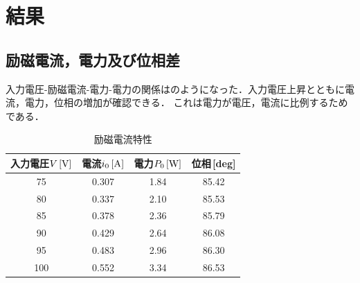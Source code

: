 \clearpage

\section{結果}
\subsection{励磁電流，電力及び位相差}
入力電圧-励磁電流-電力-電力の関係はのようになった．入力電圧上昇とともに電流，電力，位相の増加が確認できる．
	これは電力が電圧，電流に比例するためである．
	\begin{table}[h]
	\centering
	\caption{励磁電流特性}
	\label{tab:re1}
	\begin{tabular}{cccc}
	\hline
	入力電圧$V\,[\rm{V}]$& 電流$i_{0}\,[\rm{A}]$& 電力$P_{0}\,[\rm{W}]$& 位相\,[\rm{deg}]  \\ 
	\hline
	75  & 0.307    & 1.84     & 85.42 \\
	80  & 0.337    & 2.10      & 85.53 \\
	85  & 0.378    & 2.36     & 85.79 \\
	90  & 0.429    & 2.64     & 86.08 \\
	95  & 0.483    & 2.96     & 86.30 \\
	100 & 0.552    & 3.34     & 86.53 \\ \hline
	\end{tabular}
	\end{table}
	
